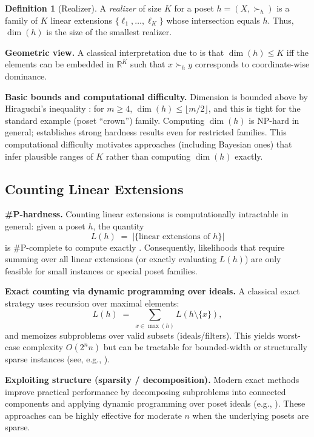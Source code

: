 \documentclass{article}
\theoremstyle{plain}
\theoremstyle{definition}
\newtheorem{definition}[theorem]{Definition}
\theoremstyle{remark}
\begin{document}
\begin{definition}[Realizer]
A \emph{realizer} of size $K$ for a poset $h=(X,\succ_h)$ is a family of $K$ linear extensions
$\{\ell_1,\dots,\ell_K\}$ whose intersection equals $h$.
Thus, $\dim(h)$ is the size of the smallest realizer.
\end{definition}

\noindent \textbf{Geometric view.}
A classical interpretation due to \citet{dushnikPartiallyOrderedSets1941} is that
$\dim(h)\le K$ iff the elements can be embedded in $\mathbb{R}^K$ such that
$x\succ_h y$ corresponds to coordinate-wise dominance.

\noindent \textbf{Basic bounds and computational difficulty.}
Dimension is bounded above by Hiraguchi's inequality \citep{Hiraguchi51,bogart1973maximal}:
for $m\ge 4$, $\dim(h)\le \lfloor m/2 \rfloor$, and this is tight for the standard example
(poset ``crown'') family.
Computing $\dim(h)$ is NP-hard in general; \citet{yannakakis1982complexity}
establishes strong hardness results even for restricted families. This computational difficulty
motivates approaches (including Bayesian ones) that infer plausible ranges of $K$ rather than
computing $\dim(h)$ exactly.


\subsection{Counting Linear Extensions}
\label{appendix:count-LE}

\noindent \textbf{\#P-hardness.}
Counting linear extensions is computationally intractable in general:
given a poset $h$, the quantity
\[
L(h) \;=\; |\{\text{linear extensions of } h\}|
\]
is \#P-complete to compute exactly \cite{brightwell1991counting}.
Consequently, likelihoods that require summing over all linear extensions (or exactly evaluating $L(h)$)
are only feasible for small instances or special poset families.

\noindent \textbf{Exact counting via dynamic programming over ideals.}
A classical exact strategy uses recursion over maximal elements:
\[
L(h) \;=\; \sum_{x \in \max(h)} L(h\setminus\{x\}),
\]
and memoizes subproblems over valid subsets (ideals/filters).
This yields worst-case complexity $O(2^n n)$ but can be tractable for bounded-width or
structurally sparse instances (see, e.g., \cite{de2006exploiting}).

\noindent \textbf{Exploiting structure (sparsity / decomposition).}
Modern exact methods improve practical performance by decomposing subproblems into connected components and applying dynamic programming over poset ideals
(e.g., \cite{kangas2016counting}).
These approaches can be highly effective for moderate $n$ when the underlying posets are sparse.
\end{document}
